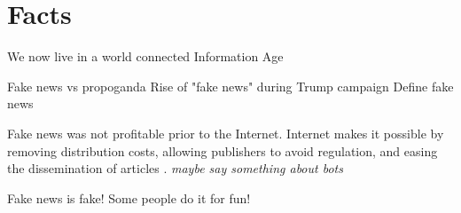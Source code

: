 

\section{Facts}

We now live in a world connected
Information Age

Fake news vs propoganda
Rise of "fake news" during Trump campaign
Define fake news

Fake news was not profitable prior to the Internet.
Internet makes it possible by removing distribution costs, allowing publishers to avoid regulation, and easing the dissemination of articles \cite{telegraph_fake_news}. \emph{maybe say something about bots}


Fake news is fake! \cite{tc_what_is_fake_news}
Some people do it for fun! \cite{cbs_fake_news}

